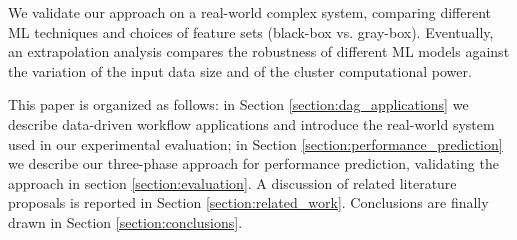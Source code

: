 \documentclass[a4paper, 10pt, conference]{ieeeconf}      %
\begin{document}

We validate our approach on a real-world complex system, comparing different ML techniques and choices of feature sets (black-box vs. gray-box). Eventually, an extrapolation analysis compares the robustness of different ML models against the variation of the input data size and of the cluster computational power.

This paper is organized as follows: in Section \ref{section:dag_applications} we describe data-driven workflow applications and introduce the real-world system used in our experimental evaluation; in Section  \ref{section:performance_prediction} we describe our three-phase approach for performance prediction, validating the approach in section \ref{section:evaluation}. A discussion of  related literature proposals is reported in Section \ref{section:related_work}. Conclusions are finally drawn in Section \ref{section:conclusions}.

\end{document}
